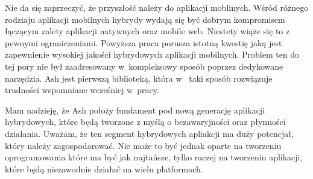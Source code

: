 \documentclass[brudnopis]{xmgr}
\begin{document}
Nie da się zaprzeczyć, że przyszłość należy do aplikacji moblinych. Wśród różnego rodziaju aplikacji mobilnych hybrydy wydają się być dobrym kompromisem łączącym zalety aplikacji natywnych oraz mobile web. Niestety wiąże się to z pewnymi ograniczeniami. Powyższa praca porusza istotną kwestię jaką jest zapewnienie wysokiej jakości hybrydowych aplikacji mobilnych. Problem ten do tej pory nie był zaadresowany w~kompleksowy sposób poprzez dedykowane narzędzia. Ash jest pierwszą biblioteką, która w~ taki sposób rozwiązuje trudności wspomniane wcześniej w~pracy.

Mam nadzieję, że Ash położy fundament pod nową generację aplikacji hybrydowych, które będą tworzone z myślą o bezawaryjności oraz płynności działania. Uważam, że ten segment hybrydowych apliakcji ma duży potencjał, który należy zagospodarować. Nie może to być jednak oparte na tworzeniu oprogramowania które ma być jak najtańsze, tylko raczej na tworzeniu aplikacji, które będą niezawodnie działać na wielu platformach.

\nocite{*}

\appendix






\oswiadczenie
\end{document}
